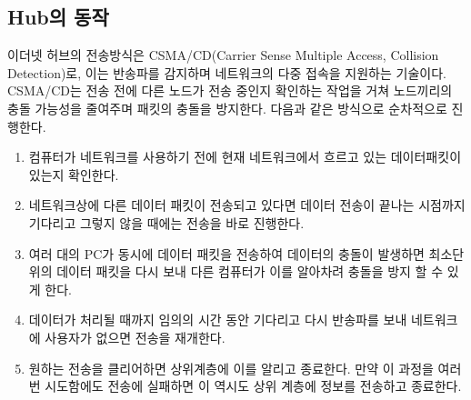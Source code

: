 \subsection{Hub의 동작}
    이더넷 허브의 전송방식은 CSMA/CD(Carrier Sense Multiple Access, Collision Detection)로, 이는 반송파를 감지하며 네트워크의 다중 접속을 지원하는 기술이다. CSMA/CD는 전송 전에  다른 노드가 전송 중인지 확인하는 작업을 거쳐 노드끼리의 충돌 가능성을 줄여주며 패킷의 충돌을 방지한다. 다음과 같은 방식으로 순차적으로 진행한다.
    \begin{enumerate}
        \item 컴퓨터가 네트워크를 사용하기 전에 현재 네트워크에서 흐르고 있는 데이터패킷이 있는지 확인한다.  
        \item 네트워크상에 다른 데이터 패킷이 전송되고 있다면 데이터 전송이 끝나는 시점까지 기다리고 그렇지 않을 때에는 전송을 바로 진행한다.
        \item 여러 대의 PC가 동시에 데이터 패킷을 전송하여 데이터의 충돌이 발생하면 최소단위의 데이터 패킷을 다시 보내 다른 컴퓨터가 이를 알아차려 충돌을 방지 할 수 있게 한다.
        \item 데이터가 처리될 때까지 임의의 시간 동안 기다리고 다시 반송파를 보내 네트워크에 사용자가 없으면 전송을 재개한다.
        \item 원하는 전송을 클리어하면 상위계층에 이를 알리고 종료한다. 만약 이 과정을 여러 번 시도함에도 전송에 실패하면 이 역시도 상위 계층에 정보를 전송하고 종료한다.
    \end{enumerate}
\newpage